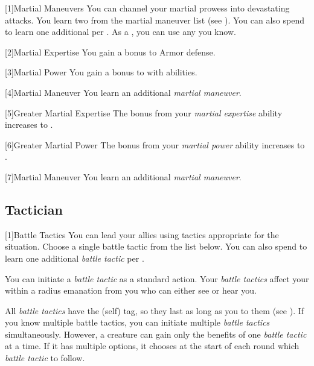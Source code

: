         [1]{Martial Maneuvers}
        You can channel your martial prowess into devastating attacks.
        You learn two  from the martial maneuver list (see ).
        You can also spend  to learn one additional  per .
        As a , you can use any  you know.

        [2]{Martial Expertise} You gain a  bonus to Armor defense.

        [3]{Martial Power} You gain a  bonus to  with  abilities.

        [4]{Martial Maneuver}
        You learn an additional \textit{martial maneuver}.

        [5]{Greater Martial Expertise} The bonus from your \textit{martial expertise} ability increases to .

        [6]{Greater Martial Power} The bonus from your \textit{martial power} ability increases to .

        [7]{Martial Maneuver}
        You learn an additional \textit{martial maneuver}.

    \subsection{Tactician}

        [1]{Battle Tactics}
        You can lead your allies using tactics appropriate for the situation.
        Choose a single battle tactic from the list below.
        You can also spend  to learn one additional \textit{battle tactic} per .

        You can initiate a \textit{battle tactic} as a standard action.
        Your \textit{battle tactics} affect your  within a \arealarge radius emanation from you who can either see or hear you.

        All \textit{battle tactics} have the  (self) tag, so they last as long as you  to them (see ).
        If you know multiple battle tactics, you can initiate multiple \textit{battle tactics} simultaneously.
        However, a creature can gain only the benefits of one \textit{battle tactic} at a time.
        If it has multiple options, it chooses at the start of each round which \textit{battle tactic} to follow.

